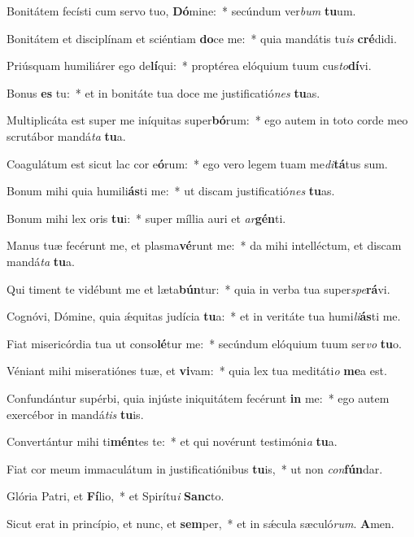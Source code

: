 \item Bonitátem fecísti cum servo tuo, \textbf{Dó}mine:~* secúndum ver\emph{bum} \textbf{tu}um.
\item Bonitátem et disciplínam et sciéntiam \textbf{do}ce me:~* quia mandátis tu\emph{is} \textbf{cré}didi.
\item Priúsquam humiliárer ego de\textbf{lí}qui:~* proptérea elóquium tuum cus\emph{to}\textbf{dí}vi.
\item Bonus \textbf{es} tu:~* et in bonitáte tua doce me justificatió\emph{nes} \textbf{tu}as.
\item Multiplicáta est super me iníquitas super\textbf{bó}rum:~* ego autem in toto corde meo scrutábor mandá\emph{ta} \textbf{tu}a.
\item Coagulátum est sicut lac cor e\textbf{ó}rum:~* ego vero legem tuam me\emph{di}\textbf{tá}tus sum.
\item Bonum mihi quia humili\textbf{ás}ti me:~* ut discam justificatió\emph{nes} \textbf{tu}as.
\item Bonum mihi lex oris \textbf{tu}i:~* super míllia auri et \emph{ar}\textbf{gén}ti.
\item Manus tuæ fecérunt me, et plasma\textbf{vé}runt me:~* da mihi intelléctum, et discam mandá\emph{ta} \textbf{tu}a.
\item Qui timent te vidébunt me et læta\textbf{bún}tur:~* quia in verba tua super\emph{spe}\textbf{rá}vi.
\item Cognóvi, Dómine, quia ǽquitas judícia \textbf{tu}a:~* et in veritáte tua humi\emph{li}\textbf{ás}ti me.
\item Fiat misericórdia tua ut conso\textbf{lé}tur me:~* secúndum elóquium tuum ser\emph{vo} \textbf{tu}o.
\item Véniant mihi miseratiónes tuæ, et \textbf{vi}vam:~* quia lex tua meditáti\emph{o} \textbf{me}a est.
\item Confundántur supérbi, quia injúste iniquitátem fecérunt \textbf{in} me:~* ego autem exercébor in mandá\emph{tis} \textbf{tu}is.
\item Convertántur mihi ti\textbf{mén}tes te:~* et qui novérunt testimóni\emph{a} \textbf{tu}a.
\item Fiat cor meum immaculátum in justificatiónibus \textbf{tu}is,~* ut non \emph{con}\textbf{fún}dar.
\item Glória Patri, et \textbf{Fí}lio,~* et Spirítu\emph{i} \textbf{Sanc}to.
\item Sicut erat in princípio, et nunc, et \textbf{sem}per,~* et in sǽcula sæculó\emph{rum}. \textbf{A}men.
